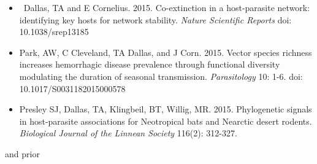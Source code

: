 \documentclass[]{CV}
\begin{document}
\begin{itemize}

\item \OA \ {\mefont Dallas, TA} and E Cornelius. 2015. Co-extinction in a host-parasite network: identifying key hosts for network stability. \textit{Nature Scientific Reports} doi: 10.1038/srep13185

\item Park, AW, C Cleveland, {\mefont TA Dallas}, and J Corn. 2015. Vector species richness increases hemorrhagic disease prevalence through functional diversity modulating the duration of seasonal transmission. \textit{Parasitology} 10: 1-6. doi: 10.1017/S0031182015000578

\item Presley SJ, {\mefont Dallas, TA}, Klingbeil, BT, Willig, MR. 2015. Phylogenetic signals in host-parasite associations for Neotropical bats and Nearctic desert rodents. \textit{Biological Journal of the Linnean Society} 116(2): 312-327. 

\end{itemize}



{ and prior}
\end{document}
